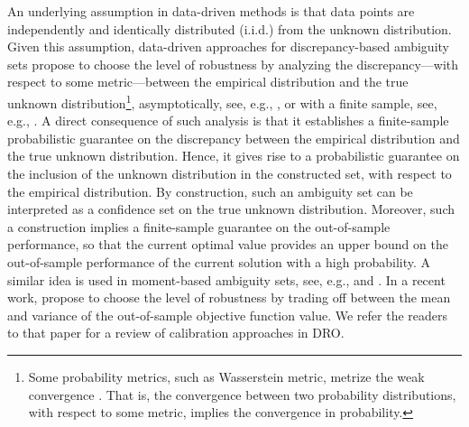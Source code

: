 \documentclass[final,onefignum,onetabnum]{class}
\newcommand{\dro}{DRO}
\begin{document}
An underlying assumption in data-driven methods is that data points are independently and identically distributed (i.i.d.) from the unknown distribution. 
Given this assumption, data-driven approaches for discrepancy-based ambiguity sets  propose to choose the level of robustness %
by analyzing the discrepancy---with respect to some metric---between the empirical distribution and the true unknown distribution\footnote{Some probability metrics, such as Wasserstein metric, metrize the weak convergence \citep{gibbs2002}. That is, the convergence between two probability distributions, with respect to some metric, implies the convergence in probability.}, asymptotically, see, e.g.,  \citet{ben2013,shafieezadeh2015},   or with a finite sample, see, e.g., \citet{pflug2007}.   %
A direct consequence of such  analysis is that it establishes a finite-sample probabilistic guarantee  on the discrepancy between the empirical distribution and the true unknown distribution. Hence, it gives rise  to a probabilistic guarantee on the inclusion of the  unknown distribution in the constructed set, with respect to the empirical distribution. By construction, such an ambiguity set can be interpreted as a confidence set on the true unknown distribution. Moreover, such a construction implies a finite-sample guarantee  on  the out-of-sample performance, so that the current optimal value provides an upper bound on the out-of-sample performance of the current solution with a high probability. 
A similar idea is used in moment-based ambiguity sets, see, e.g., \citet{goldfarb2003} and \citet{delage2010}. 
In a recent work, \citet{gotoh2017} propose to choose the level of robustness by trading off between the mean and variance of the out-of-sample objective function value. We refer the readers to that paper for a review of calibration approaches in \dro. 


\end{document}
